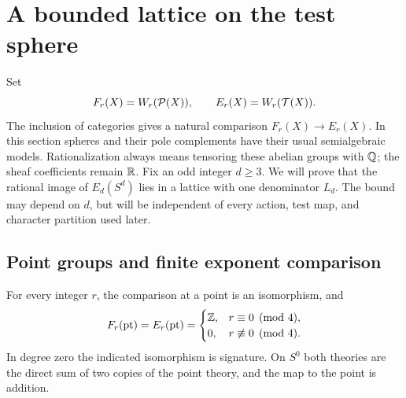 \section{A bounded lattice on the test sphere}
\label{sec:lattice}

Set
\[
 F_r(X)=W_r(\mathcal P(X)),\qquad
 E_r(X)=W_r(\mathcal T(X)).
\]
The inclusion of categories gives a natural comparison
$F_r(X)\to E_r(X)$.  In this section spheres and their pole complements
have their usual semialgebraic models.  Rationalization always means
tensoring these abelian groups with $\mathbb Q$; the sheaf coefficients remain
$\mathbb R$.  Fix an odd integer $d\geq3$.  We will prove that the rational
image of $E_d(S^d)$ lies in a lattice with one denominator $L_d$.
The bound may depend on $d$, but will be independent of every action,
test map, and character partition used later.

\subsection{Point groups and finite exponent comparison}

\begin{lemma}
\label{lat:point-groups}
For every integer $r$, the comparison at a point is an isomorphism, and
\[
 F_r(\mathrm{pt})=E_r(\mathrm{pt})=
 \begin{cases}
  \mathbb Z,&r\equiv0\pmod4,\\
  0,&r\not\equiv0\pmod4.
 \end{cases}
\]
In degree zero the indicated isomorphism is signature.  On $S^0$ both
theories are the direct sum of two copies of the point theory, and the
map to the point is addition.
\end{lemma}

